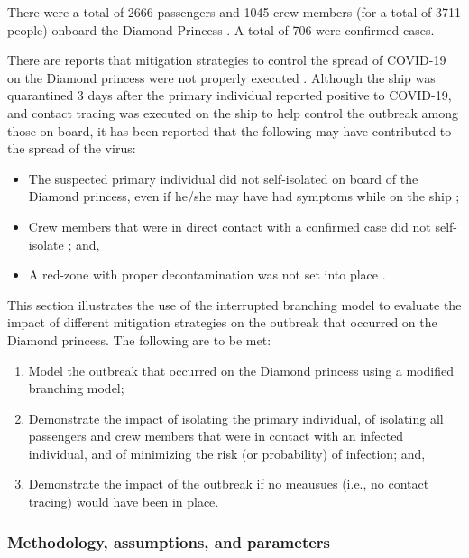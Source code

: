\documentclass[sr]{drdc-report}
\begin{document}
There were a total of 2666 passengers and 1045 crew members (for a total of 3711 people) onboard the Diamond Princess \cite{10..15585/mmwr..mm6912e3}. A total of 706 were confirmed cases.  

There are reports that mitigation strategies to control the spread of COVID-19 on the Diamond princess were not properly executed \cite{10..1002/jgf2..326}. Although the ship was quarantined 3 days after the primary individual reported positive to COVID-19, and contact tracing was executed on the ship to help control the outbreak among those on-board, it has been reported that the following may have contributed to the spread of the virus:

\begin{itemize} 
\item The suspected primary individual did not self-isolated on board of the Diamond princess, even if he/she may have had symptoms while on the ship \cite{news_patient_zero}\cite{10..1016/j..ijid..2020..02..033};
\item Crew members that were in direct contact with a confirmed case did not self-isolate \cite{10..1002/jgf2..326} \cite{10..15585/mmwr..mm6912e3}; and,
\item A red-zone with proper decontamination was not set into place \cite{10..1002/jgf2..326}. 
\end{itemize}	
 
This section illustrates the use of the interrupted branching model to evaluate the impact of different mitigation strategies on the outbreak that occurred on the Diamond princess. The following are to be met:

\begin{enumerate}
\item Model the outbreak that occurred on the Diamond princess using a modified branching model;
\item Demonstrate the impact of isolating the primary individual, of isolating all passengers and crew members that were in contact with an infected individual, and of minimizing the risk (or probability) of infection; and, 
\item Demonstrate the impact of the outbreak if no meausues (i.e., no contact tracing) would have been in place.
\end{enumerate}

\subsubsection{Methodology, assumptions, and parameters}
\end{document}
